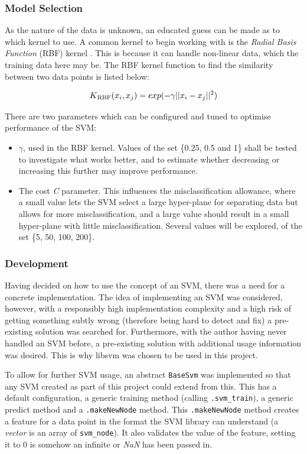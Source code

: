 \subsubsection*{Model Selection}
As the nature of the data is unknown, an educated guess can be made as to which kernel to use. A common kernel to begin working with is the \textit{Radial Basis Function} (RBF) kernel \cite{Chih-WeiHsuChih-ChungChang2008}. This is because it can handle non-linear data, which the training data here may be. The RBF kernel function to find the similarity between two data points is listed below:

\begin{equation*}
K\textsubscript{RBF}(x_i, x_j) = exp(-\gamma||x_i - x_j||^2)
\end{equation*}

\noindent There are two parameters which can be configured and tuned to optimise performance of the SVM:
\begin{itemize}
	\item $\gamma$, used in the RBF kernel. Values of the set \{0.25, 0.5 and 1\} shall be tested to investigate what works better, and to estimate whether decreasing or increasing this further may improve performance.
	\item The cost \textit{C} parameter. This influences the misclassification allowance, where a small value lets the SVM select a large hyper-plane for separating data but allows for more misclassification, and a large value should result in a small hyper-plane with little misclassification. Several values will be explored, of the set \{5, 50, 100, 200\}.
\end{itemize}

\subsubsection*{Development}
Having decided on how to use the concept of an SVM, there was a need for a concrete implementation. The idea of implementing an SVM was considered, however, with a responsibly high implementation complexity and a high risk of getting something subtly wrong (therefore being hard to detect and fix) a pre-existing solution was searched for. Furthermore, with the author having never handled an SVM before, a pre-existing solution with additional usage information was desired. This is why libsvm was chosen to be used in this project.

To allow for further SVM usage, an abstract \texttt{BaseSvm} was implemented so that any SVM created as part of this project could extend from this. This has a default configuration, a generic training method (calling \texttt{.svm\_train}), a generic predict method and a \texttt{.makeNewNode} method. This \texttt{.makeNewNode} method creates a feature for a data point in the format the SVM library can understand (a \textit{vector} is an array of \texttt{svm\_node}). It also validates the value of the feature, setting it to 0 is somehow an infinite or \textit{NaN} has been passed in. 

